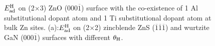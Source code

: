 \begingroup
\begin{figure}[!ht]
  \centering
  \label{Chap:ZnO_H:fig:2dop}
  \label{Chap:ZnO_H:fig:otherads}
\caption[$E_{\textup{ad}}^{\textup{H}}$ on (2$\times$3) ZnO (000$\overline{1}$) surface with the co-existence of 1 Al substitutional dopant atom and 1 Ti substitutional dopant atom at bulk Zn sites.]{$E_{\textup{ad}}^{\textup{H}}$ on (2$\times$3) ZnO (000$\overline{1}$) surface with the co-existence of 1 Al substitutional dopant atom and 1 Ti substitutional dopant atom at bulk Zn sites. (a):$E_{\textup{ad}}^{\textup{H}}$ on (2$\times$2) zincblende ZnS ($\overline{1}$$\overline{1}$$\overline{1}$) and wurtzite GaN (000$\overline{1}$) surfaces with different $\theta_{\textup{H}}$. }
  \label{Chap:ZnO_H:fig:others}
\end{figure}
\endgroup

